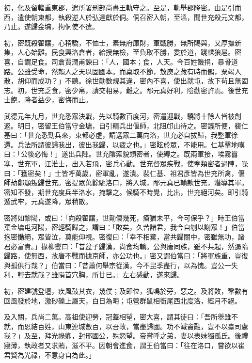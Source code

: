 \begin{pinyinscope}
 初，化及留輜重東郡，遣所署刑部尚書王軌守之。至是，軌舉郡降密。由是引而西，遣使朝東都，執殺逆人於弘達獻於侗。侗召密入朝，至溫，聞世充殺元文都，乃止。遂歸金墉，拘侗使不遣。



 初，密既殺翟讓，心稍驕，不恤士，素無府庫財，軍戰勝，無所賜與，又厚撫新集，人心始離。民食興洛倉者，給授無檢，至負取不勝，委於道，踐輮狼扈。密喜，自謂足食。司倉賈潤甫諫曰：「人，國本；食，人天。今百姓饑捐，暴骨道路。公雖受命，然賴人之天以固國本。而稟取不節，敖庾之藏有時而儩，粟竭人散，胡仰而成功？」不聽。徐世勣數規其違，密內不喜，使出就屯，故下茍且無固志。初，世充乏食，密少帛，請交相易，難之。邴元真好利，陰勸密許焉。後世充士飽，降者益少，密悔而止。



 武德元年九月，世充悉眾決戰，先以騎數百度河，密遣迎戰，驍將十餘人皆被創返。明日，密留王伯當守金墉，自引精兵出偃師，北阻邙山待之。密議所便，裴仁基曰：「世充悉勁兵來，東都必虛，請選眾二萬向洛，世充必自拔歸，我整軍徐還。兵法所謂彼歸我出，彼出我歸，以疲之也。」密眩於眾，不能用。仁基擊地嘆曰：「公後必悔！」遂出兵陣。世充陰索貌類密者，使縛之。既兩軍接，埃霧囂塞，世充軍，江淮士，出入若飛，密兵心動。世充督眾疾戰，使牽類密者過陣，噪曰：「獲密矣！」士皆呼萬歲，密軍亂，遂潰。裴仁基、祖君彥皆為世充所禽，偃師劫鄭頲叛歸世充。密提眾萬餘馳洛口，將入城，邴元真已輸款世充，潛導其軍。密知不發，期世充度兵半洛水，掩擊之。候騎不時覺，比出，世充絕河矣。即引騎遁武牢，元真遂降，眾稍散。



 密將如黎陽，或曰：「向殺翟讓，世勣傷幾死，瘡猶未平，今可保乎？」時王伯當棄金墉屯河陽，密輕騎歸之，謂曰：「敗矣，久苦諸君，我今自刎以謝眾！」伯當抱密慟絕，眾皆泣，莫能仰視。密復曰：「幸不相棄，當共歸關中，密雖無功，諸君必富貴。」掾柳燮曰：「昔盆子歸漢，尚食均輸。公與唐同族，雖不共起，然遏隋歸路，使無西，故唐不戰而據京師，亦公功也。」密又謂伯當曰：「將軍族重，豈復與孤俱行哉？」伯當曰：「昔蕭何舉宗從漢，今不昆季盡行，以為愧。豈公一失利，輕去就哉？雖隕首穴胸，所甘已。」左右感動，遂來歸。



 初，密建號登壇，疾風鼓其衣，幾僕；及即位，狐鳴於旁，惡之。及將敗，鞏數有回風發於地，激砂礫上屬天，白日為晦；屯營群鼠相銜尾西北度洛，經月不絕。



 及入關，兵尚二萬。高祖使迎勞，冠蓋相望，密大喜，謂其徒曰：「吾所舉雖不就，而恩結百姓，山東連城數百，以吾故，當盡歸國。功不減竇融，豈不以臺司處我？」及至，拜光祿卿，封邢國公，殊怨望。帝嘗呼之弟，妻以表妹獨孤氏。後禮寢薄，執政者又求賄，滋不平。因朝會進食，謂王伯當曰：「往在洛口，嘗欲以崔君賢為光祿，不意身自為此。」




\end{pinyinscope}
